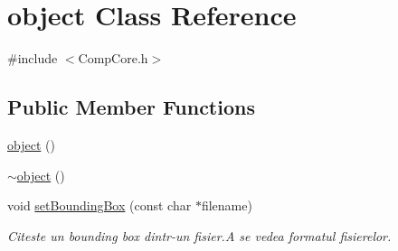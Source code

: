 \hypertarget{structobject}{\section{object Class Reference}
\label{structobject}
}


{\ttfamily \#include $<$Comp\-Core.\-h$>$}

\subsection*{Public Member Functions}
\begin{DoxyCompactItemize}
\item 
\hyperlink{structobject_a04aad740887b47c735b9ed9078e45d77}{object} ()
\item 
\hyperlink{structobject_aecd824abdc96ff340acf4ea25a34d76d}{$\sim$object} ()
\item 
void \hyperlink{structobject_ab64ca513c1f82c36595b8832b4a4cac6}{set\-Bounding\-Box} (const char $\ast$filename)
\begin{DoxyCompactList}\small\item\em Citeste un bounding box dintr-\/un fisier.\-A se vedea formatul fisierelor. \end{DoxyCompactList}\end{DoxyCompactItemize}
